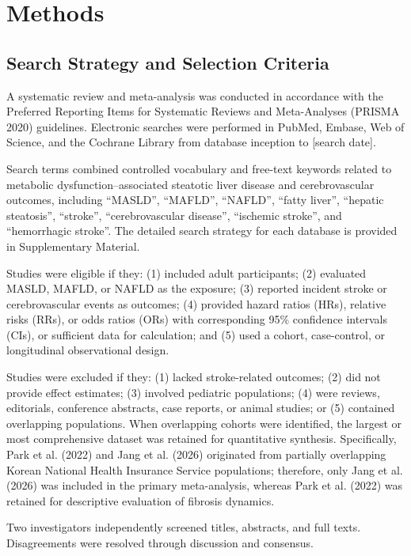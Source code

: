 \documentclass[12pt,a4paper]{article}
\begin{document}
\section{Methods}

\subsection{Search Strategy and Selection Criteria}

A systematic review and meta-analysis was conducted in accordance with the Preferred Reporting Items for Systematic Reviews and Meta-Analyses (PRISMA 2020) guidelines. Electronic searches were performed in PubMed, Embase, Web of Science, and the Cochrane Library from database inception to [search date].

Search terms combined controlled vocabulary and free-text keywords related to metabolic dysfunction--associated steatotic liver disease and cerebrovascular outcomes, including ``MASLD'', ``MAFLD'', ``NAFLD'', ``fatty liver'', ``hepatic steatosis'', ``stroke'', ``cerebrovascular disease'', ``ischemic stroke'', and ``hemorrhagic stroke''. The detailed search strategy for each database is provided in Supplementary Material.

Studies were eligible if they: (1) included adult participants; (2) evaluated MASLD, MAFLD, or NAFLD as the exposure; (3) reported incident stroke or cerebrovascular events as outcomes; (4) provided hazard ratios (HRs), relative risks (RRs), or odds ratios (ORs) with corresponding 95\% confidence intervals (CIs), or sufficient data for calculation; and (5) used a cohort, case-control, or longitudinal observational design.

Studies were excluded if they: (1) lacked stroke-related outcomes; (2) did not provide effect estimates; (3) involved pediatric populations; (4) were reviews, editorials, conference abstracts, case reports, or animal studies; or (5) contained overlapping populations. When overlapping cohorts were identified, the largest or most comprehensive dataset was retained for quantitative synthesis. Specifically, Park et al. (2022) and Jang et al. (2026) originated from partially overlapping Korean National Health Insurance Service populations; therefore, only Jang et al. (2026) was included in the primary meta-analysis, whereas Park et al. (2022) was retained for descriptive evaluation of fibrosis dynamics.

Two investigators independently screened titles, abstracts, and full texts. Disagreements were resolved through discussion and consensus.
\end{document}

